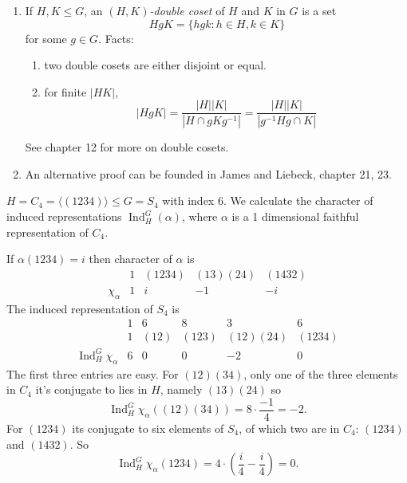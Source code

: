 \documentclass[a4paper]{article}
\DeclareMathOperator{\Ind}{Ind} %
\theoremstyle{definition}
\begin{document}
\begin{remark}\leavevmode
  \begin{enumerate}
  \item If \(H, K \leq G\), an \emph{\((H, K)\)-double coset} of \(H\) and \(K\) in \(G\) is a set
    \[
      HgK = \{hgk: h \in H, k \in K\}
    \]
    for some \(g \in G\). Facts:
    \begin{enumerate}
    \item two double cosets are either disjoint or equal.
    \item for finite \(|HK|\),
      \[
        |H g K|
        = \frac{|H| |K|}{|H \cap g K g^{-1}|}
        = \frac{|H| |K|}{|g^{-1} H g  \cap K|}
      \]
    \end{enumerate}
    See chapter 12 for more on double cosets.
  \item An alternative proof can be founded in James and Liebeck, chapter 21, 23.
  \end{enumerate}
\end{remark}

\begin{eg}
  \(H = C_4 = \langle (1234) \rangle \leq G = S_4\) with index \(6\). We calculate the character of induced representations \(\Ind_H^G(\alpha)\), where \(\alpha\) is a 1 dimensional faithful representation of \(C_4\).

  If \(\alpha(1234) = i\) then character of \(\alpha\) is
  \[
    \begin{array}{r|cccc}
      & 1 & (1234) & (13)(24) & (1432) \\ \hline
      \chi_\alpha & 1 & i & -1 & -i
    \end{array}
  \]
  The induced representation of \(S_4\) is
  \[
    \begin{array}{r|cccccc}
      & 1 & 6 & 8 & 3 & 6 \\
      & 1 & (12) & (123) & (12)(24) & (1234) \\ \hline
      \Ind_H^G \chi_\alpha  & 6 & 0 & 0 & -2 & 0
    \end{array}
  \]
  The first three entries are easy. For \((12)(34)\), only one of the three elements in \(C_4\) it's conjugate to lies in \(H\), namely \((13)(24)\) so
  \[
    \Ind_H^G \chi_\alpha ((12)(34)) = 8 \cdot \frac{-1}{4} = -2.
  \]
  For \((1234)\) its conjugate to six elements of \(S_4\), of which two are in \(C_4\): \((1234)\) and \((1432)\). So
  \[
    \Ind_H^G \chi_\alpha (1234) = 4 \cdot \left(\frac{i}{4} - \frac{i}{4} \right) = 0.
  \]
\end{eg}
\end{document}
